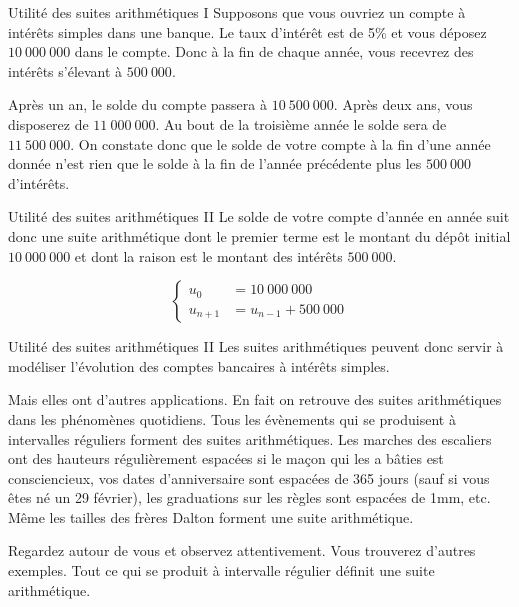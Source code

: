 \documentclass{beamer}
\begin{document}
\begin{frame}{Utilité des suites arithmétiques I}
  Supposons que vous ouvriez un compte à intérêts simples dans une banque. Le taux d'intérêt est de 5\% et vous déposez $10\ 000\ 000$ dans le compte. Donc à la fin de chaque année, vous recevrez des intérêts s'élevant à $500\ 000$.

  Après un an, le solde du compte passera à $10\ 500\ 000$. Après deux ans, vous disposerez de $11\ 000\ 000$. Au bout de la troisième année le solde sera de $11\ 500\ 000$. On constate donc que le solde de votre compte à la fin d'une année donnée n'est rien que le solde à la fin de l'année précédente plus les $500\ 000$ d'intérêts.
\end{frame}

\begin{frame}{Utilité des suites arithmétiques II}
  Le solde de votre compte d'année en année suit donc une suite arithmétique dont le premier terme est le montant du dépôt initial $10\ 000\ 000$ et dont la raison est le montant des intérêts $500\ 000$.

  \[
    \begin{cases}
      u_0 &= 10\ 000\ 000 \\
      u_{n+1} &= u_{n-1} + 500\ 000
    \end{cases}
  \]
\end{frame}

\begin{frame}{Utilité des suites arithmétiques II}
  Les suites arithmétiques peuvent donc servir à modéliser l'évolution des comptes bancaires à intérêts simples.

  Mais elles ont d'autres applications. En fait on retrouve des suites arithmétiques dans les phénomènes quotidiens. Tous les évènements qui se produisent à intervalles réguliers forment des suites arithmétiques. Les marches des escaliers ont des hauteurs régulièrement espacées si le maçon qui les a bâties est consciencieux, vos dates d'anniversaire sont espacées de 365 jours (sauf si vous êtes né un 29 février), les graduations sur les règles sont espacées de 1mm, etc. Même les tailles des frères Dalton forment une suite arithmétique.

  Regardez autour de vous et observez attentivement. Vous trouverez d'autres exemples. Tout ce qui se produit à intervalle régulier définit une suite arithmétique.
\end{frame}
\end{document}

